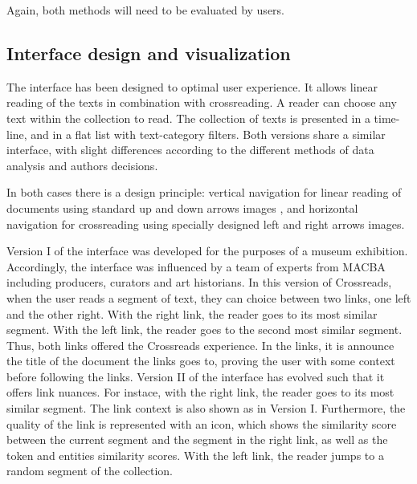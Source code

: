 \documentclass{acm_proc_article-sp}
\begin{document}
Again, both methods will need to be evaluated by users.

\subsection{Interface design and visualization }

The interface has been designed to optimal user experience. It allows linear reading of the texts in combination with crossreading. A reader can choose any text within the collection to read.
The collection of texts is presented in a time-line, and in a flat list with text-category filters. Both versions share a similar interface, with slight differences according to the different methods of data analysis and authors decisions.


In both cases there is a design principle: vertical navigation for linear reading of documents \textemdash{}using standard up and down arrows images\textemdash{} , and horizontal navigation for crossreading \textemdash{}using specially designed left and right arrows images.


Version I of the interface was developed for the purposes of a museum exhibition. 
Accordingly, the interface was influenced by a team of experts from MACBA including producers, curators and art historians. In this version of Crossreads, when the user reads a segment of text,
they can choice between two links, one left and the other
right.
With the right link, the reader 
goes to its most similar segment.
With the left link, the reader goes to the second most similar segment. Thus, both links offered the
Crossreads experience. In the links, it is announce the title of the
document the links goes to, proving the user with some context before
following the links.
Version II of the interface has evolved such that it offers link nuances.
For instace, with the right link, the reader goes to its most similar segment. The
link context is also shown as in Version I. Furthermore, the quality
of the link is represented with an icon, which shows the similarity
score between the current segment and the segment in the right link,
as well as the token and entities similarity scores. With the left link,
the reader jumps to a random segment of the collection.
\end{document}

